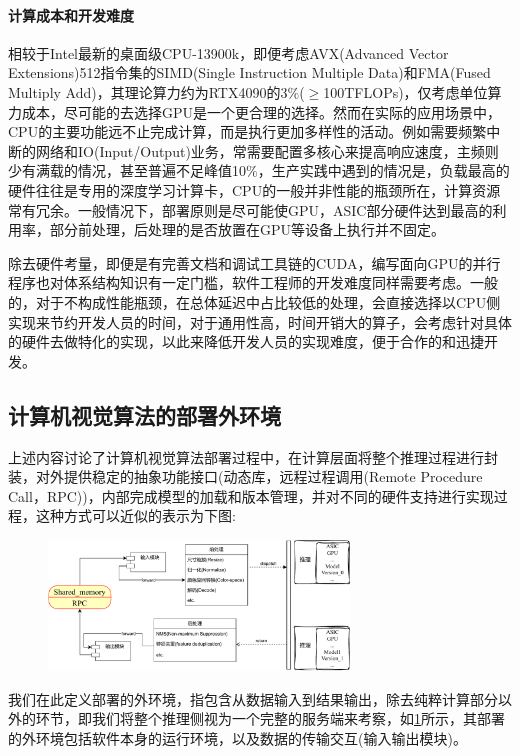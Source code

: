 \documentclass[master]{shtthesis}
\begin{document}
\paragraph{计算成本和开发难度}
相较于Intel最新的桌面级CPU-13900k，即便考虑AVX(Advanced Vector Extensions)512指令集的SIMD(Single Instruction Multiple Data)和FMA(Fused Multiply Add)，其理论算力约为RTX4090的3$\%$($\geq$100TFLOPs)，仅考虑单位算力成本，尽可能的去选择GPU是一个更合理的选择。然而在实际的应用场景中，CPU的主要功能远不止完成计算，而是执行更加多样性的活动。例如需要频繁中断的网络和IO(Input/Output)业务，常需要配置多核心来提高响应速度，主频则少有满载的情况，甚至普遍不足峰值10$\%$，生产实践中遇到的情况是，负载最高的硬件往往是专用的深度学习计算卡，CPU的一般并非性能的瓶颈所在，计算资源常有冗余。一般情况下，部署原则是尽可能使GPU，ASIC部分硬件达到最高的利用率，部分前处理，后处理的是否放置在GPU等设备上执行并不固定。

除去硬件考量，即便是有完善文档和调试工具链的CUDA，编写面向GPU的并行程序也对体系结构知识有一定门槛，软件工程师的开发难度同样需要考虑。一般的，对于不构成性能瓶颈，在总体延迟中占比较低的处理，会直接选择以CPU侧实现来节约开发人员的时间，对于通用性高，时间开销大的算子，会考虑针对具体的硬件去做特化的实现，以此来降低开发人员的实现难度，便于合作的和迅捷开发。

\subsection{计算机视觉算法的部署外环境}\label{计算机视觉算法模型的部署外环境}
上述内容讨论了计算机视觉算法部署过程中，在计算层面将整个推理过程进行封装，对外提供稳定的抽象功能接口(动态库，远程过程调用(Remote Procedure Call，RPC))，内部完成模型的加载和版本管理，并对不同的硬件支持进行实现过程，这种方式可以近似的表示为下图:

\begin{figure}[htbp]
	\centering
	\includegraphics[width=8cm]{img/frame.pdf}
	\label{计算机视觉算法部署框架}
\end{figure}

我们在此定义部署的外环境，指包含从数据输入到结果输出，除去纯粹计算部分以外的环节，即我们将整个推理侧视为一个完整的服务端来考察，如\ref{计算机视觉算法部署框架}所示，其部署的外环境包括软件本身的运行环境，以及数据的传输交互(输入输出模块)。
\end{document}
